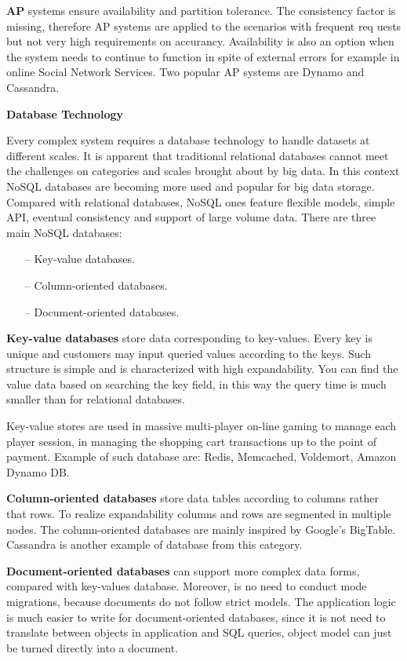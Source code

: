 \textbf{AP} systems ensure availability and partition tolerance. The consistency factor is missing, therefore AP systems are applied to the scenarios with frequent req
uests but not very high requirements on accurancy. Availability is also an option when the system needs to continue to function in spite of external errors\cite{AP} for example in online Social Network Services. Two popular AP systems are Dynamo and Cassandra. 

\textbf{Database Technology}

Every complex system requires a database technology to handle datasets at different scales. It is apparent that traditional relational databases cannot meet the challenges on categories and scales brought about by big data. In this context NoSQL databases are becoming more used and popular for big data storage. Compared with relational databases, NoSQL ones feature flexible models, simple API, eventual consistency and support of large volume data. There are three main NoSQL databases:
 
\begin{itemize}
\item[--] Key-value databases.
\item[--] Column-oriented databases.
\item[--] Document-oriented databases.
\end{itemize} 

\textbf{Key-value databases} store data corresponding to key-values. Every key is unique and customers may input queried values according to the keys. Such structure is simple and is characterized with high expandability. You can find the value data based on searching the key field, in this way the query time is much smaller than for relational databases.

Key-value stores are used in massive multi-player on-line gaming to manage each player session, in managing the shopping cart transactions up to the point of payment. Example of such database are: Redis, Memcached, Voldemort, Amazon Dynamo DB.

\textbf{Column-oriented databases} store data tables according to columns rather that rows. To realize expandability columns and rows are segmented in multiple nodes. The column-oriented databases are mainly inspired by Google's BigTable. Cassandra is another example of database from this category.

\textbf{Document-oriented databases} can support more complex data forms, compared with key-values database. Moreover, is no need to conduct mode migrations, because documents do not follow strict models. The application logic is much easier to write for document-oriented databases, since it is not need to translate between objects in application and SQL queries, object model can just be turned directly into a document.

